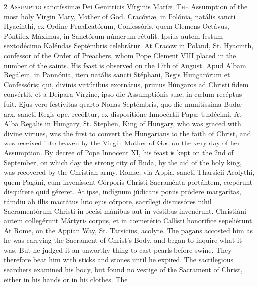 \begin{paracol}{2}
\lettrine[lines=2]{A}{ssúmptio} sanctíssimæ 
 Dei Genitrícis Vírginis Maríæ.
\switchcolumn
{}
\lettrine[lines=2]{T}{he} Assumption of the most holy 
 Virgin Mary, Mother of God.
\switchcolumn*
{}
Cracóviæ, in Polónia, 
 natális sancti Hyacínthi, ex Ordine Prædicatórum, Confessóris, quem Clemens 
 Octávus, Póntifex Máximus, in Sanctórum númerum rétulit. Ipsíus autem 
 festum sextodécimo Kaléndas Septémbris celebrátur.
\switchcolumn
{}
At Cracow in Poland, St. Hyacinth, 
 confessor of the Order of Preachers, whom Pope Clement VIII placed in the 
 number of the saints. His feast is observed on the 17th of August.
\switchcolumn*
{}
Apud Albam Regálem, in 
 Pannónia, item natális sancti Stéphani, Regis Hungarórum et Confessóris; 
 qui, divínis virtútibus exornátus, primus Húngaros ad Christi fidem 
 convértit, et a Deípara Vírgine, ipso die Assumptiónis suæ, in cælum 
 recéptus fuit. Ejus vero festívitas quarto Nonas Septémbris, quo die 
 munitíssima Budæ arx, sancti Regis ope, recólitur, ex dispositióne 
 Innocéntii Papæ Undécimi.
\switchcolumn
{}
At Alba Regalis in Hungary, St. 
 Stephen, King of Hungary, who was graced with divine virtues, was the first 
 to convert the Hungarians to the faith of Christ, and was received into 
 heaven by the Virgin Mother of God on the very day of her Assumption. 
 By decree of Pope Innocent XI, his feast is kept on the 2nd of September, on 
 which day the strong city of Buda, by the aid of the holy king, was 
 recovered by the Christian army.
\switchcolumn*
{}
Romæ, via Appia, sancti 
 Tharsícii Acolythi, quem Pagáni, cum inveníssent Córporis Christi Sacraménta 
 portántem, cœpérunt disquírere quid géreret. At ipse, indígnum 
 júdicans porcis pródere margarítas, támdiu ab illis mactátus luto ejus 
 córpore, sacrílegi discussóres nihil Sacramentórum Christi in occísi mánibus 
 aut in véstibus invenérunt. Christiáni autem collegérunt Mártyris 
 corpus, et in cœmetério Callísti honorifice sepeliérunt.
\switchcolumn
{}
At Rome, on the Appian Way, St. 
 Tarsicius, acolyte. The pagans accosted him as he was carrying the 
 Sacrament of Christ's Body, and began to inquire what it was. But he 
 judged it an unworthy thing to cast pearls before swine. They 
 therefore beat him with sticks and stones until he expired. The 
 sacrilegious searchers examined his body, but found no vestige of the 
 Sacrament of Christ, either in his hands or in his clothes. The 

\end{paracol}
